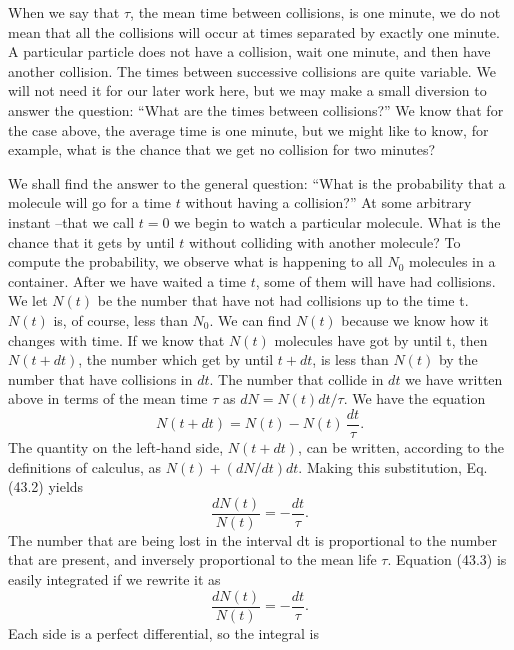 \begin{subappendices}
When we say that $\tau$, the mean time between collisions, is one minute, we do not mean that all the collisions will occur at times separated by exactly one minute. A particular particle does not have a collision, wait one minute, and then have another collision. The times between successive collisions are quite variable. We will not need it for our later work here, but we may make a small diversion to answer the question: ``What are the times between collisions?'' We know that for the case above, the average time is one minute, but we might like to know, for example, what is the chance that we get no collision for two minutes?

We shall find the answer to the general question: ``What is the probability that a molecule will go for a time $t$ without having a collision?'' At some arbitrary instant --that we call $t=0$ we begin to watch a particular molecule. What is the chance that it gets by until $t$ without colliding with another molecule? To compute the probability, we observe what is happening to all $N_{0}$ molecules in a container. After we have waited a time $t$, some of them will have had collisions. We let $N(t)$ be the number that have not had collisions up to the time t. $N(t)$ is, of course, less than $N_{0}$. We can find $N(t)$ because we know how it changes with time. If we know that $N(t)$ molecules have got by until t, then $N(t+dt)$, the number which get by until $t+dt$, is less than $N(t)$ by the number that have collisions in $dt$. The number that collide in $dt$ we have written above in terms of the mean time $\tau$ as $dN=N(t)dt/\tau$. We have the equation
%
\begin{equation}
\label{Eq:I:43:2}
N(t + dt) = N(t) - N(t)\,\frac{dt}{\tau}.
\end{equation}
%
The quantity on the left-hand side, $N(t+dt)$, can be written, according to the definitions of calculus, as $N(t)+(dN/dt)dt$. Making this substitution, Eq. (43.2) yields
\begin{equation}
\label{Eq:I:43:4}
\frac{dN(t)}{N(t)} = -\frac{dt}{\tau}.
\end{equation}
%
The number that are being lost in the interval dt is proportional to the number that are present, and inversely proportional to the mean life $\tau$. Equation (43.3) is easily integrated if we rewrite it as
\begin{equation}
\label{Eq:I:43:4}
\frac{dN(t)}{N(t)} = -\frac{dt}{\tau}.
\end{equation}
Each side is a perfect differential, so the integral is
\begin{equation}

\end{equation}
\end{subappendices}

